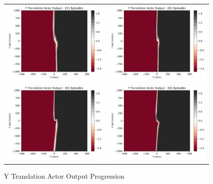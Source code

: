 \begin{figure}[H]
\begin{tabular}{cc}
		\includegraphics[width=65mm]{figures/train_figs/transy_actor/Actor2_221.pdf} &   \includegraphics[width=65mm]{figures/train_figs/transy_actor/Actor2_261.pdf} \\
		\includegraphics[width=65mm]{figures/train_figs/transy_actor/Actor2_301.pdf} &   \includegraphics[width=65mm]{figures/train_figs/transy_actor/Actor2_341.pdf} \\
	\end{tabular}
	\caption{Y Translation Actor Output Progression}\label{fig:y_actor_contour}
\end{figure}
